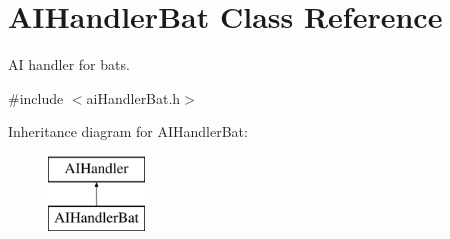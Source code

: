 \hypertarget{classAIHandlerBat}{
\section{\-A\-I\-Handler\-Bat \-Class \-Reference}
\label{df/d90/classAIHandlerBat}
}


\-A\-I handler for bats.  




{\ttfamily \#include $<$ai\-Handler\-Bat.\-h$>$}

\-Inheritance diagram for \-A\-I\-Handler\-Bat\-:\begin{figure}[H]
\begin{center}
\leavevmode
\includegraphics[height=2.000000cm]{df/d90/classAIHandlerBat}
\end{center}
\end{figure}
